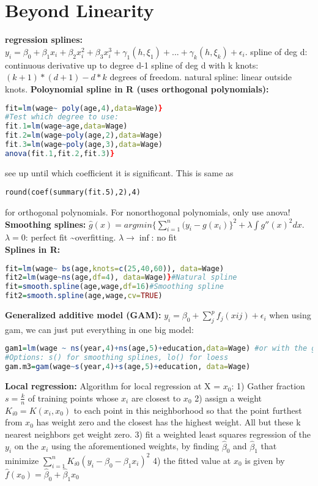 \section{Beyond Linearity}
\textbf{regression splines: } 
$y_i = \beta_0 + \beta_1x_i + \beta_2x_i^2 + \beta_3x_i^3 + \gamma_1(h, \xi_1) + ... + \gamma_k(h, \xi_k) + \epsilon_i$.
spline of deg d: continuous derivative up to degree d-1
spline of deg d with k knots: $(k+1)*(d+1)-d*k$ degrees of freedom. 
natural spline: linear outside knots. 
\textbf{Poloynomial spline in R (uses orthogonal polynomials):} \begin{lstlisting}[language=R]
fit=lm(wage~ poly(age,4),data=Wage)}
#Test which degree to use:
fit.1=lm(wage~age,data=Wage)
fit.2=lm(wage~poly(age,2),data=Wage)
fit.3=lm(wage~poly(age,3),data=Wage)
anova(fit.1,fit.2,fit.3)}\end{lstlisting} see up until which coefficient it is significant. This is same as \begin{lstlisting}
round(coef(summary(fit.5),2),4)
\end{lstlisting} for orthogonal polynomials. For nonorthogonal polynomials, only use anova! \\
\textbf{Smoothing splines: } $\hat g(x) = argmin \{\sum_{i=1}^n (y_i - g(x_i)\}^2 + \lambda \int g'' (x)^2 dx$. $\lambda = 0$: perfect fit \textasciitilde overfitting. $\lambda \rightarrow \inf$: no fit \\
\textbf{Splines in R:}
\begin{lstlisting}[language=R] 
fit=lm(wage~ bs(age,knots=c(25,40,60)), data=Wage)
fit2=lm(wage~ns(age,df=4), data=Wage)}#Natural spline
fit=smooth.spline(age,wage,df=16)#Smoothing spline
fit2=smooth.spline(age,wage,cv=TRUE)
\end{lstlisting}
\textbf{Generalized additive model (GAM): } $y_i = \beta_0 + \sum_j^p f_j(xij) + \epsilon_i$
when using gam, we can just put everything in one big model:
\begin{lstlisting}[language=R]
gam1=lm(wage ~ ns(year,4)+ns(age,5)+education,data=Wage) #or with the gam library: 
#Options: s() for smoothing splines, lo() for loess
gam.m3=gam(wage~s(year,4)+s(age,5)+education, data=Wage)\end{lstlisting}

\textbf{Local regression: }
Algorithm for local regression at X = $x_0$: 1) Gather fraction $s = \frac{k}{n}$ of training points whose $x_i$ are closest to $x_0$ 2) assign a weight $K_{i0} = K(x_i, x_0)$ to each point in this neighborhood so that the point furthest from $x_0$ has weight zero and the closest has the highest weight. All but these k nearest neighbors get weight zero. 3) fit a weighted least squares regression of the $y_i$ on the $x_i$ using the aforementioned weights, by finding $\hat \beta_0$ and $\hat \beta_1$ that minimize $\sum_{i=1}^n K_{i0}(y_i-\beta_0-\beta_1x_i)^2$ 4) the fitted value at $x_0$ is given by $\hat f(x_0) = \hat \beta_0 + \hat \beta_1 x_0$